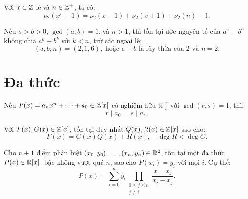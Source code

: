 \documentclass[../imo-training-open-book.tex]{subfiles}
\begin{document}
\vspace{1em}

\begin{theorem*}
    \label{theorem:lte-even-difference}
    Với \( x \in \mathbb Z \) lẻ và \( n \in \mathbb Z^+ \), ta có:
    \[
        \nu_2(x^n - 1) = \nu_2(x - 1) + \nu_2(x + 1) + \nu_2(n) - 1.
    \]
\end{theorem*}

\vspace{1em}

\begin{theorem*}
    \label{theorem:zsigmondy}
    Nếu \( a > b > 0 \), \( \gcd(a, b) = 1 \), và \( n > 1 \), thì tồn tại ước nguyên tố của \( a^n - b^n \) không chia \( a^k - b^k \) với \( k < n \), trừ các ngoại lệ:
    \[
        (a, b, n) = (2, 1, 6), \text{ hoặc } a + b \text{ là lũy thừa của 2 và } n = 2.
    \]
\end{theorem*}

\newpage

\section{Đa thức}

\begin{theorem*}
    \label{theorem:rational-root-theorem}
    Nếu \( P(x) = a_nx^n + \dots + a_0 \in \mathbb Z[x] \) có nghiệm hữu tỉ \( \frac{r}{s} \) với \( \gcd(r,s) = 1 \), thì:
    \[
        r \mid a_0,\quad s \mid a_n.
    \]
\end{theorem*}

\vspace{1em}

\begin{theorem*}
    \label{theorem:polynomial-division}
    Với \( F(x), G(x) \in \mathbb Z[x] \), tồn tại duy nhất \( Q(x), R(x) \in \mathbb Z[x] \) sao cho:
    \[
        F(x) = G(x) Q(x) + R(x),\quad \deg R < \deg G.
    \]
\end{theorem*}

\vspace{1em}

\begin{theorem*}
    \label{theorem:lagrange-interpolation}
    Cho \( n+1 \) điểm phân biệt \( (x_0, y_0), \ldots, (x_n, y_n) \in \mathbb R^2 \), tồn tại một đa thức \( P(x) \in \mathbb R[x] \), bậc không vượt quá \( n \), sao cho \( P(x_i) = y_i \) với mọi \( i \). Cụ thể:
    \[
        P(x) = \sum_{i=0}^n y_i \prod_{\substack{0 \le j \le n \\ j \ne i}} \frac{x - x_j}{x_i - x_j}.
    \]
\end{theorem*}
\end{document}
